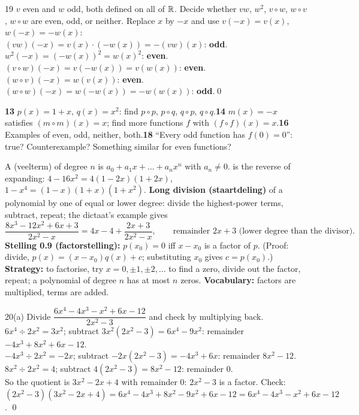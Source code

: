 \begin{bookex}{19}
$v$ even and $w$ odd, both defined on all of $\mathbb{R}$. Decide whether $vw$, $w^2$, $v\circ w$, $w\circ v$, $w\circ w$ are even, odd, or neither.
\solution
Replace $x$ by $-x$ and use $v(-x)=v(x)$, $w(-x)=-w(x)$:\\
$(vw)(-x)=v(x)\cdot(-w(x))=-(vw)(x)$: \textbf{odd}.\quad $w^2(-x)=(-w(x))^2=w(x)^2$: \textbf{even}.\\
$(v\circ w)(-x)=v(-w(x))=v(w(x))$: \textbf{even}.\quad $(w\circ v)(-x)=w(v(x))$: \textbf{even}.\\
$(w\circ w)(-x)=w(-w(x))=-w(w(x))$: \textbf{odd}.\qed
\end{bookex}

\begin{trybox}[{13, 14, 16, 18}]
\textbf{13} $p(x)=1+x$, $q(x)=x^2$: find $p\circ p$, $p\circ q$, $q\circ p$, $q\circ q$.\quad \textbf{14} $m(x)=-x$ satisfies $(m\circ m)(x)=x$; find more functions $f$ with $(f\circ f)(x)=x$.\quad \textbf{16} Examples of even, odd, neither, both.\quad \textbf{18} ``Every odd function has $f(0)=0$'': true? Counterexample? Something similar for even functions?
\end{trybox}


\begin{key}
A  (veelterm) of degree $n$ is $a_0+a_1x+\dots+a_nx^n$ with $a_n\ne0$.  is the reverse of expanding: $4-16x^2=4(1-2x)(1+2x)$, $1-x^4=(1-x)(1+x)(1+x^2)$. \textbf{Long division (staartdeling)} of a polynomial by one of equal or lower degree: divide the highest-power terms, subtract, repeat; the dictaat's example gives
\[
\frac{8x^3-12x^2+6x+3}{2x^2-x}=4x-4+\frac{2x+3}{2x^2-x},\qquad\text{remainder }2x+3\text{ (lower degree than the divisor).}
\]
\textbf{Stelling 0.9 (factorstelling):} $p(x_0)=0$ iff $x-x_0$ is a factor of $p$. (Proof: divide, $p(x)=(x-x_0)q(x)+c$; substituting $x_0$ gives $c=p(x_0)$.) \textbf{Strategy:} to factorise, try $x=0,\pm1,\pm2,\dots$ to find a zero, divide out the factor, repeat; a polynomial of degree $n$ has at most $n$ zeros. \textbf{Vocabulary:} factors are multiplied, terms are added.
\end{key}

\begin{bookex}{20(a)}
Divide $\dfrac{6x^4-4x^3-x^2+6x-12}{2x^2-3}$ and check by multiplying back.
\solution
$6x^4\div2x^2=3x^2$; subtract $3x^2(2x^2-3)=6x^4-9x^2$: remainder $-4x^3+8x^2+6x-12$.\\
$-4x^3\div2x^2=-2x$; subtract $-2x(2x^2-3)=-4x^3+6x$: remainder $8x^2-12$.\\
$8x^2\div2x^2=4$; subtract $4(2x^2-3)=8x^2-12$: remainder $0$.\\
So the quotient is $3x^2-2x+4$ with remainder $0$: $2x^2-3$ is a factor. Check: $(2x^2-3)(3x^2-2x+4)=6x^4-4x^3+8x^2-9x^2+6x-12=6x^4-4x^3-x^2+6x-12$. \checkmark\qed
\end{bookex}

